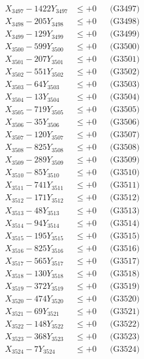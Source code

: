 \documentclass[a4paper,10pt]{article}
\begin{document}
{\begin{align}
X_{3497} - 1422Y_{3497} &\leq +0 && \text{(G3497)} \\
X_{3498} - 205Y_{3498} &\leq +0 && \text{(G3498)} \\
X_{3499} - 129Y_{3499} &\leq +0 && \text{(G3499)} \\
X_{3500} - 599Y_{3500} &\leq +0 && \text{(G3500)} \\
\allowbreak
X_{3501} - 207Y_{3501} &\leq +0 && \text{(G3501)} \\
X_{3502} - 551Y_{3502} &\leq +0 && \text{(G3502)} \\
X_{3503} - 64Y_{3503} &\leq +0 && \text{(G3503)} \\
X_{3504} - 13Y_{3504} &\leq +0 && \text{(G3504)} \\
X_{3505} - 719Y_{3505} &\leq +0 && \text{(G3505)} \\
X_{3506} - 35Y_{3506} &\leq +0 && \text{(G3506)} \\
X_{3507} - 120Y_{3507} &\leq +0 && \text{(G3507)} \\
X_{3508} - 825Y_{3508} &\leq +0 && \text{(G3508)} \\
X_{3509} - 289Y_{3509} &\leq +0 && \text{(G3509)} \\
X_{3510} - 85Y_{3510} &\leq +0 && \text{(G3510)} \\
\allowbreak
X_{3511} - 741Y_{3511} &\leq +0 && \text{(G3511)} \\
X_{3512} - 171Y_{3512} &\leq +0 && \text{(G3512)} \\
X_{3513} - 48Y_{3513} &\leq +0 && \text{(G3513)} \\
X_{3514} - 94Y_{3514} &\leq +0 && \text{(G3514)} \\
X_{3515} - 195Y_{3515} &\leq +0 && \text{(G3515)} \\
X_{3516} - 825Y_{3516} &\leq +0 && \text{(G3516)} \\
X_{3517} - 565Y_{3517} &\leq +0 && \text{(G3517)} \\
X_{3518} - 130Y_{3518} &\leq +0 && \text{(G3518)} \\
X_{3519} - 372Y_{3519} &\leq +0 && \text{(G3519)} \\
X_{3520} - 474Y_{3520} &\leq +0 && \text{(G3520)} \\
\allowbreak
X_{3521} - 69Y_{3521} &\leq +0 && \text{(G3521)} \\
X_{3522} - 148Y_{3522} &\leq +0 && \text{(G3522)} \\
X_{3523} - 368Y_{3523} &\leq +0 && \text{(G3523)} \\
X_{3524} - 7Y_{3524} &\leq +0 && \text{(G3524)} \\

\end{align}}
\end{document}
